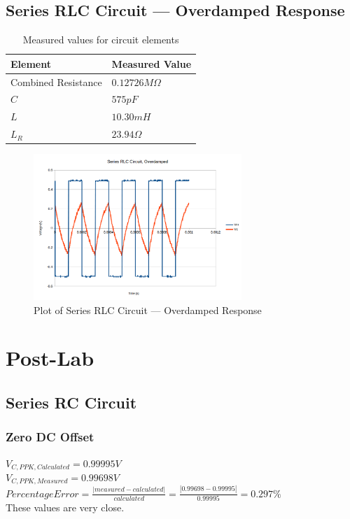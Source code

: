\documentclass[10pt]{article}
\begin{document}
\subsection*{Series RLC Circuit --- Overdamped Response}
\begin{table}[H]
	\centering
	\begin{tabular}{ll}
		\hline
		\textbf{Element} & \textbf{Measured Value}\\
		\hline
		Combined Resistance & $0.12726 M\Omega$\\
		$C$ & $575pF$\\
		$L$ & $10.30mH$\\
		$L_R$ & $23.94\Omega$\\
		\hline
	\end{tabular}
	\caption{Measured values for circuit elements}
\end{table}
\begin{figure}[H]
	\centering
	\includegraphics[width=0.7\textwidth]{RLC_Over.png}
	\caption{Plot of Series RLC Circuit --- Overdamped Response}
\end{figure}

\section*{Post-Lab}
\subsection*{Series RC Circuit}
\subsubsection*{Zero DC Offset}
$V_{C,PPK,Calculated} = 0.99995V$\\
$V_{C,PPK,Measured} = 0.99698V$\\
$Percentage Error = \frac{|measured-calculated|}{calculated} = \frac{|0.99698-0.99995|}{0.99995} = 0.297\%$\\
\noindent These values are very close.
\end{document}
